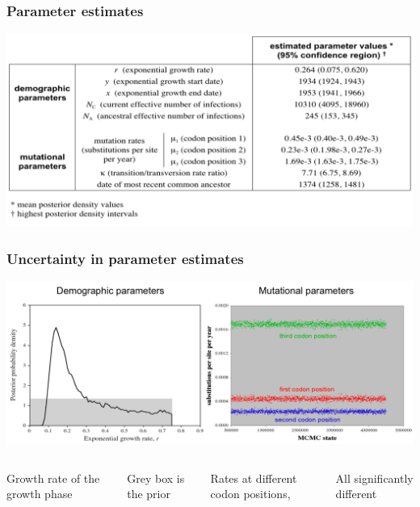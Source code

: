 \begin{frame}
\frametitle{Parameter estimates}

\includegraphics[width=\textwidth]{../../images/ParameterEstimates}

\end{frame}

\begin{frame}
\frametitle{Uncertainty in parameter estimates}

\includegraphics[width=\textwidth]{../../images/UncertaintyParameter}

\footnotesize{
\begin{columns}[t]


Growth rate of the growth phase

Grey box is the prior


Rates at different codon positions,

All significantly different

\end{columns}
}

\end{frame}

